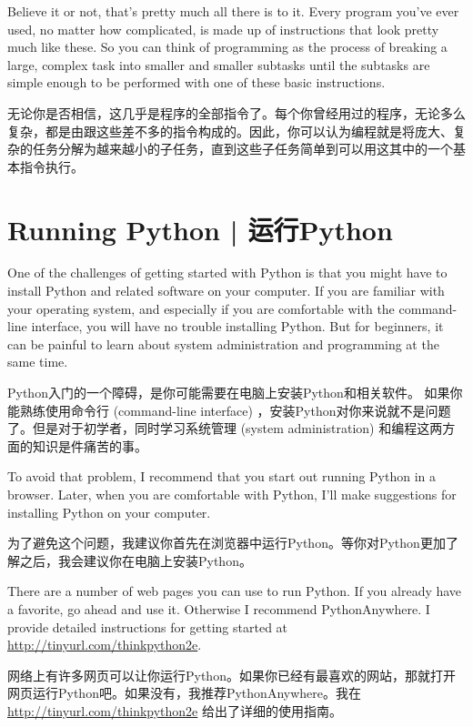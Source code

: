 Believe it or not, that's pretty much all there is to it.  Every
program you've ever used, no matter how complicated, is made up of
instructions that look pretty much like these.  So you can think of
programming as the process of breaking a large, complex task
into smaller and smaller subtasks until the subtasks are
simple enough to be performed with one of these basic instructions.

无论你是否相信，这几乎是程序的全部指令了。每个你曾经用过的程序，无论多么复杂，都是由跟这些差不多的指令构成的。因此，你可以认为编程就是将庞大、复杂的任务分解为越来越小的子任务，直到这些子任务简单到可以用这其中的一个基本指令执行。

\section{Running Python  |  运行Python}

One of the challenges of getting started with Python is that you
might have to install Python and related software on your computer.
If you are familiar with your operating system, and especially
if you are comfortable with the command-line interface, you will
have no trouble installing Python.  But for beginners, it can be
painful to learn about system administration and programming at the
same time.

Python入门的一个障碍，是你可能需要在电脑上安装Python和相关软件。
如果你能熟练使用命令行 (command-line interface) ，安装Python对你来说就不是问题了。但是对于初学者，同时学习系统管理 (system administration) 和编程这两方面的知识是件痛苦的事。
  

To avoid that problem, I recommend that you start out running Python
in a browser.  Later, when you are comfortable with Python, I'll
make suggestions for installing Python on your computer.

为了避免这个问题，我建议你首先在浏览器中运行Python。等你对Python更加了解之后，我会建议你在电脑上安装Python。

There are a number of web pages you can use to run Python.  If you
already have a favorite, go ahead and use it.  Otherwise I recommend
PythonAnywhere.  I provide detailed instructions for getting started
at \url{http://tinyurl.com/thinkpython2e}.

网络上有许多网页可以让你运行Python。如果你已经有最喜欢的网站，那就打开网页运行Python吧。如果没有，我推荐PythonAnywhere。我在 \href{http://tinyurl.com/thinkpython2e}{http://tinyurl.com/thinkpython2e} 给出了详细的使用指南。


